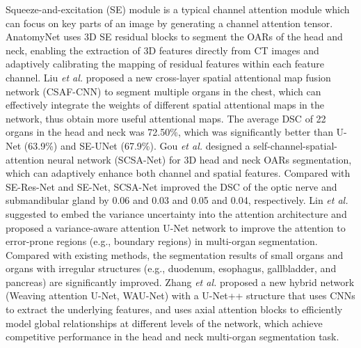 \documentclass[lettersize,journal]{IEEEtran}
\begin{document}
Squeeze-and-excitation (SE) module \cite{169} is a typical channel attention module which can focus on key parts of an image by generating a channel attention tensor. AnatomyNet \cite{39} uses 3D SE residual blocks to segment the OARs of the head and neck, enabling the extraction of 3D features directly from CT images and adaptively calibrating the mapping of residual features within each feature channel. Liu {\it{et al.}} \cite{45} proposed a new cross-layer spatial attentional map fusion network (CSAF-CNN) to segment multiple organs in the chest, which can effectively integrate the weights of different spatial attentional maps in the network, thus obtain more useful attentional maps. The average DSC of 22 organs in the head and neck was 72.50\%, which was significantly better than U-Net (63.9\%) and SE-UNet (67.9\%). Gou {\it{et al.}} \cite{42} designed a self-channel-spatial-attention neural network (SCSA-Net) for 3D head and neck OARs segmentation, which can adaptively enhance both channel and spatial features. Compared with SE-Res-Net and SE-Net, SCSA-Net improved the DSC of the optic nerve and submandibular gland by 0.06 and 0.03 and 0.05 and 0.04, respectively. Lin {\it{et al.}} \cite{70} suggested to embed the variance uncertainty into the attention architecture and proposed a variance-aware attention U-Net network to improve the attention to error-prone regions (e.g., boundary regions) in multi-organ segmentation. Compared with existing methods, the segmentation results of small organs and organs with irregular structures (e.g., duodenum, esophagus, gallbladder, and pancreas) are significantly improved. Zhang {\it{et al.}} \cite{48} proposed a new hybrid network (Weaving attention U-Net, WAU-Net) with a U-Net++ \cite{170} structure that uses CNNs to extract the underlying features, and uses axial attention blocks to efficiently model global relationships at different levels of the network, which achieve competitive performance in the head and neck multi-organ segmentation task.
\end{document}
